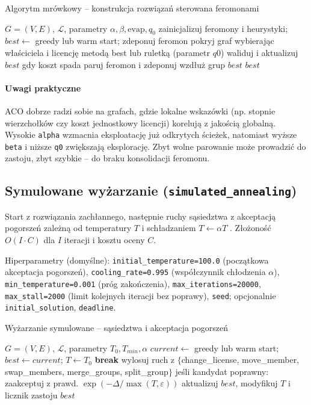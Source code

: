 \begin{algorithm}[H]
\caption{Algorytm mrówkowy – konstrukcja rozwiązań sterowana feromonami}
\label{alg:aco}
\begin{algorithmic}[1]
\Require $G=(V,E)$, $\mathcal{L}$, parametry $\alpha,\beta,\text{evap},q_0$
\State zainicjalizuj feromony i heurystyki; $best\gets$ greedy lub warm start; zdeponuj feromon
    \State pokryj graf wybierając właściciela i licencję metodą best lub ruletką (parametr $q0$)
    \State waliduj i aktualizuj $best$ gdy koszt spada
  \EndFor
  \State paruj feromon i zdeponuj wzdłuż grup $best$
\EndFor
\State \Return $best$
\end{algorithmic}
\end{algorithm}

\paragraph{Uwagi praktyczne}
ACO dobrze radzi sobie na grafach, gdzie lokalne wskazówki (np. stopnie wierzchołków czy koszt jednostkowy licencji) korelują z jakością globalną. Wysokie \texttt{alpha} wzmacnia eksploatację już odkrytych ścieżek, natomiast wyższe \texttt{beta} i niższe \texttt{q0} zwiększają eksplorację. Zbyt wolne parowanie może prowadzić do zastoju, zbyt szybkie – do braku konsolidacji feromonu.

\subsection{Symulowane wyżarzanie (\texttt{simulated\_annealing})}\label{subsec:sa}
Start z rozwiązania zachłannego, następnie ruchy sąsiedztwa z akceptacją pogorszeń zależną od temperatury \(T\) i schładzaniem \(T\leftarrow \alpha T\) \cite{kirkpatrick1983}. Złożoność \(O(I\cdot C)\) dla \(I\) iteracji i kosztu oceny \(C\).

Hiperparametry (domyślne): \texttt{initial\_temperature=100.0} (początkowa akceptacja pogorszeń), \texttt{cooling\_rate=0.995} (współczynnik chłodzenia \(\alpha\)), \texttt{min\_temperature=0.001} (próg zakończenia), \texttt{max\_iterations=20000}, \texttt{max\_stall=2000} (limit kolejnych iteracji bez poprawy), \texttt{seed}; opcjonalnie \texttt{initial\_solution}, \texttt{deadline}.

\begin{algorithm}[H]
\caption{Wyżarzanie symulowane – sąsiedztwa i akceptacja pogorszeń}
\label{alg:sa}
\begin{algorithmic}[1]
\Require $G=(V,E)$, $\mathcal{L}$, parametry $T_0, T_{min}, \alpha$
\State $current\gets$ greedy lub warm start; $best\gets current$; $T\gets T_0$
   \textbf{break} \EndIf
  \State wylosuj ruch z $\{$change\_license, move\_member, swap\_members, merge\_groups, split\_group$\}$
  \State jeśli kandydat poprawny: zaakceptuj z prawd. $\exp(-\Delta/\max(T,\varepsilon))$
  \State aktualizuj $best$, modyfikuj $T$ i licznik zastoju
\EndFor
\State \Return $best$
\end{algorithmic}
\end{algorithm}

